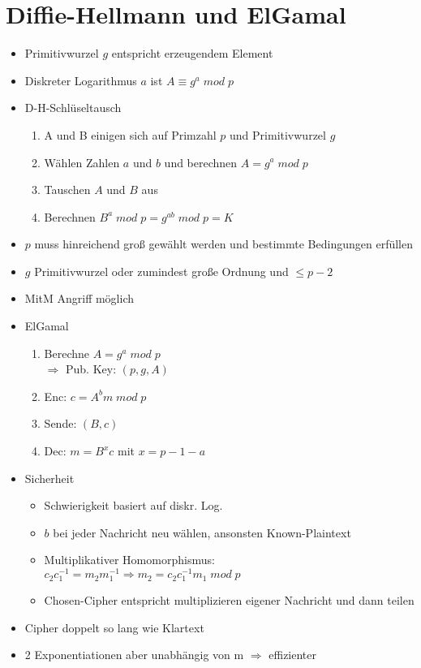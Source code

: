 \documentclass[11pt, paper=a4, twocolumn]{scrartcl}
\begin{document}
	\section{Diffie-Hellmann und ElGamal}
		\begin{itemize}
			\item Primitivwurzel $g$ entspricht erzeugendem Element
			\item Diskreter Logarithmus $a$ ist $A\equiv g^a\;mod\;p$
			\item D-H-Schlüseltausch
				\begin{enumerate}
					\item A und B einigen sich auf Primzahl $p$ und Primitivwurzel $g$
					\item Wählen Zahlen $a$ und $b$ und berechnen $A=g^a\;mod\;p$
					\item Tauschen $A$ und $B$ aus
					\item Berechnen $B^a\;mod\;p=g^{ab}\;mod\;p=K$
				\end{enumerate}
			\item $p$ muss hinreichend groß gewählt werden und bestimmte Bedingungen erfüllen
			\item $g$ Primitivwurzel oder zumindest große Ordnung und $\leq p-2$
			\item MitM Angriff möglich
			\item ElGamal
				\begin{enumerate}
					\item Berechne $A=g^a\;mod\;p$\\
						$\Rightarrow$ Pub. Key: $(p,g,A)$
					\item Enc: $c=A^bm\;mod\;p$
					\item Sende: $(B,c)$
					\item Dec: $m=B^xc$ mit $x=p-1-a$
				\end{enumerate}
			\item Sicherheit
				\begin{itemize}
					\item Schwierigkeit basiert auf diskr. Log.
					\item $b$ bei jeder Nachricht neu wählen, ansonsten Known-Plaintext
					\item Multiplikativer Homomorphismus:\\
						$c_2c_1^{-1}=m_2m_1^{-1}\Rightarrow m_2=c_2c_1^{-1}m_1\;mod\;p$ 
					\item Chosen-Cipher entspricht multiplizieren eigener Nachricht und dann teilen
				\end{itemize}
			\item Cipher doppelt so lang wie Klartext
			\item 2 Exponentiationen aber unabhängig von m $\Rightarrow$ effizienter
		\end{itemize}
	
\end{document}
